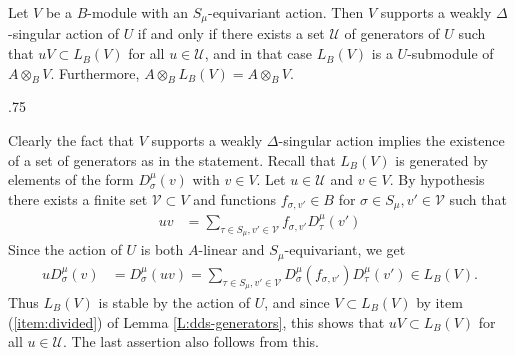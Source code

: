 \documentclass[11pt,fleqn]{article}
\makeatletter
\newcounter{para}[section]
\renewenvironment{proof}[1][\textit{Proof}]{\par
  \pushQED{\qed}%
  \normalfont \topsep.75\paraskip\relax
  \trivlist
  \item[\hskip\labelsep
        \itshape
    #1\@addpunct{.}]\ignorespaces
}{%
  \popQED\endtrivlist\@endpefalse
}
\newcommand\V{\mathcal V}
\newcommand\ot{\otimes}
\makeatother
\begin{document}
\begin{Proposition}
\label{P:weak-action-conditions}
Let $V$ be a $B$-module with an $S_\mu$-equivariant action. Then 
$V$ supports a weakly $\Delta$-singular action of $U$ if and only if there 
exists a set $\mathcal U$ of generators of $U$ such that $u V \subset L_B(V)$
for all $u \in \mathcal U$, and in that case $L_B(V)$ is a $U$-submodule of 
$A \ot_B V$. Furthermore, $A \ot_B L_B(V) = A \ot_B V$.
\end{Proposition}
\begin{proof}
Clearly the fact that $V$ supports a weakly $\Delta$-singular action implies
the existence of a set of generators as in the statement. Recall that $L_B(V)$ 
is generated by elements of the form $D^\mu_\sigma(v)$ with $v \in V$. Let 
$u \in \mathcal U$ and $v \in V$. By hypothesis there exists a finite set 
$\mathcal V \subset V$ and functions $f_{\sigma,v'} \in B$ for $\sigma \in 
S_\mu, v' \in \mathcal V$ such that
\begin{align*}
u v 
  &= \sum_{\tau \in S_\mu, v' \in \V} 
    f_{\sigma,v'} D^\mu_\tau (v')
\end{align*}
Since the action of $U$ is both $A$-linear and $S_\mu$-equivariant, we get
\begin{align*}
u D^\mu_\sigma (v)
  &= D^\mu_\sigma (u v)
  = \sum_{\tau \in S_\mu, v' \in \V} 
      D^\mu_{\sigma}(f_{\sigma,v'}) D^\mu_\tau (v') 
      \in L_B(V).
\end{align*}
Thus $L_B(V)$ is stable by the action of $U$, and since $V \subset L_B(V)$ by 
item (\ref{item:divided}) of Lemma \ref{L:dds-generators}, this shows that $u V
\subset L_B(V)$ for all $u \in \mathcal U$. The last assertion also follows 
from this.
\end{proof}
\end{document}
